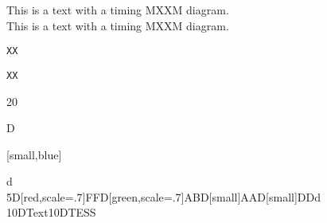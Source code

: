 \documentclass{article}
\newcounter{hexcount}
\newcommand{\hexcount}{%
  \pgfmathdectoBase\thehexcount{\value{hexcount}}{16}%
  \thehexcount
  \addtocounter{hexcount}{+1}%
}
\begin{document}
\noindent
This is a text with a timing MXXM diagram.\\
This is a text with a timing MXXM diagram.


\def\gobble#1{}

\texttt\bgroup XX\egroup

\DeclareRobustCommand\testtt[1]{\texttt{#1}}
\testtt\bgroup XX\egroup

\noindent
\begin{tikztimingexampletable}
  [d]20{D{[small,blue]\hexcount}}d \\
 5{D{[red,scale=.7]FF}}D{[green,scale=.7]AB}D{[small]AA}D{[small]DD}d \\
 10D{Text}10D{TESS} \\
\end{tikztimingexampletable}
\end{document}
